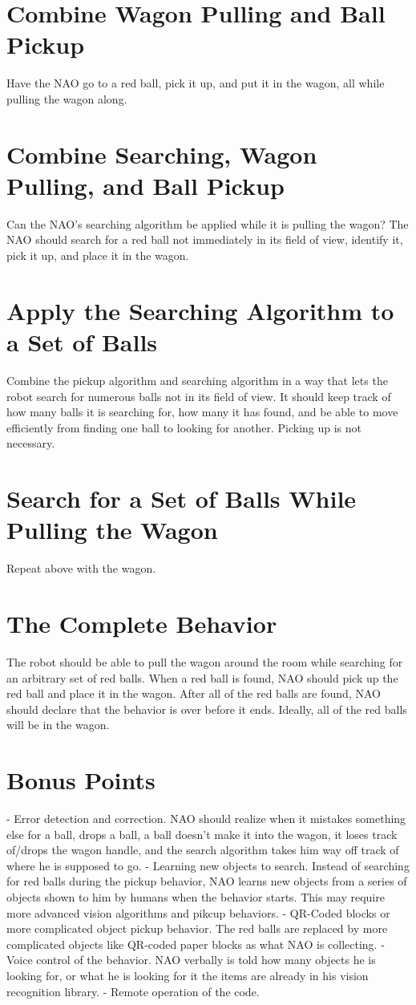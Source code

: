 \documentclass{article}
\begin{document}
\section{Combine Wagon Pulling and Ball Pickup}
Have the NAO go to a red ball, pick it up, and put it in the wagon, all while pulling the wagon along.  

\section{Combine Searching, Wagon Pulling, and Ball Pickup}
Can the NAO's searching algorithm be applied while it is pulling the wagon?  The NAO should search for a red ball not immediately in its field of view, identify it, pick it up, and place it in the wagon.

\section{Apply the Searching Algorithm to a Set of Balls}
Combine the pickup algorithm and searching algorithm in a way that lets the robot search for numerous balls not in its field of view.  It should keep track of how many balls it is searching for, how many
it has found, and be able to move efficiently from finding one ball to looking for another.  Picking up is not necessary.

\section{Search for a Set of Balls While Pulling the Wagon}
Repeat above with the wagon.

\section{The Complete Behavior}
The robot should be able to pull the wagon around the room while searching for an arbitrary set of red balls.  When a red ball is found, NAO should pick up the red ball and place it in the wagon.  After
all of the red balls are found, NAO should declare that the behavior is over before it ends.  Ideally, all of the red balls will be in the wagon. 

\section{Bonus Points}
- Error detection and correction.  NAO should realize when it mistakes something else for a ball, drops a ball, a ball doesn't make it into the wagon, it loses track of/drops the wagon handle,
and the search algorithm takes him way off track of where he is supposed to go.
- Learning new objects to search.  Instead of searching for red balls during the pickup behavior, NAO learns new objects from a series of objects shown to him by humans when the behavior starts.  This may
require more advanced vision algorithms and pikcup behaviors.
- QR-Coded blocks or more complicated object pickup behavior.  The red balls are replaced by more complicated objects like QR-coded paper blocks as what NAO is collecting.  
- Voice control of the behavior.  NAO verbally is told how many objects he is looking for, or what he is looking for it the items are already in his vision recognition library.
- Remote operation of the code.
\end{document}

